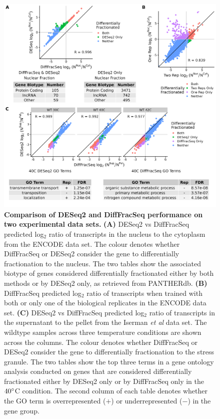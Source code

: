 \documentclass[../main.tex]{subfiles}
\begin{document}
\begin{figure}

{\centering \includegraphics[width=1\linewidth]{figures/DESeq_vs_bayesian_encode_and_iserman_combined.png} 

}

\caption[DiffFracSeq vs DESeq2 performance on the experimental data sets.]{\textbf{Comparison of DESeq2 and DiffFracSeq performance on two experimental data sets.} \textbf{(A)} DESeq2 vs DiffFracSeq predicted log$_2$ ratio of transcripts in the nucleus to the cytoplasm from the ENCODE data set. The colour denotes whether DiffFracSeq or DESeq2 consider the gene to differentially fractionation to the nucleus. The two tables show the associated biotype of genes considered differentially fractionated either by both methods or by DESeq2 only, as retrieved from PANTHERdb. \textbf{(B)} DiffFracSeq predicted log$_2$ ratio of transcripts when trained with both or only one of the biological replicates in the ENCODE data set. \textbf{(C)} DESeq2 vs DiffFracSeq predicted log$_2$ ratio of transcripts in the supernatant to the pellet from the Iserman \textit{et al} data set. The wildtype samples across three temperature conditions are shown across the columns. The colour denotes whether DiffFracSeq or DESeq2 consider the gene to differentially fractionation to the stress granule. The two tables show the top three terms in a gene ontology analysis conducted on genes that are considered differentially fractionated either by DESeq2 only or by DiffFracSeq only in the $40\degree$C condition. The second column of each table denotes whether the GO term is overrepresented ($+$) or underrepresented ($-$) in the gene group.} \label{fig:encode-iserman-data-results}
\end{figure}
\newpage
\end{document}
